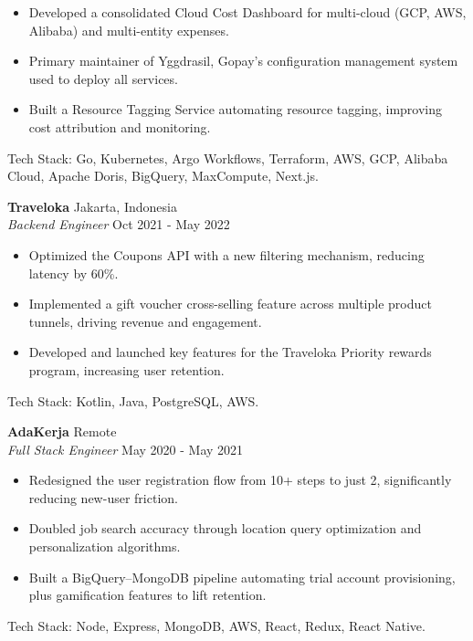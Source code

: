 \documentclass[a4paper]{article}
\begin{document}
\begin{itemize}
    \item Developed a consolidated Cloud Cost Dashboard for multi-cloud (GCP, AWS, Alibaba) and multi-entity expenses.
    \item Primary maintainer of Yggdrasil, Gopay's configuration management system used to deploy all services.
    \item Built a Resource Tagging Service automating resource tagging, improving cost attribution and monitoring.
\end{itemize}
Tech Stack: Go, Kubernetes, Argo Workflows, Terraform, AWS, GCP, Alibaba Cloud, Apache Doris, BigQuery, MaxCompute, Next.js.
\vspace{1.5mm}

\textbf{Traveloka} \hfill Jakarta, Indonesia\\
\textit{Backend Engineer} \hfill Oct 2021 - May 2022\\
\begin{itemize}
    \item Optimized the Coupons API with a new filtering mechanism, reducing latency by 60\%.
    \item Implemented a gift voucher cross-selling feature across multiple product tunnels, driving revenue and engagement.
    \item Developed and launched key features for the Traveloka Priority rewards program, increasing user retention.
\end{itemize}
Tech Stack: Kotlin, Java, PostgreSQL, AWS.
\vspace{1.5mm}

\textbf{AdaKerja} \hfill Remote\\
\textit{Full Stack Engineer} \hfill May 2020 - May 2021\\
\begin{itemize}
    \item Redesigned the user registration flow from 10+ steps to just 2, significantly reducing new-user friction.
    \item Doubled job search accuracy through location query optimization and personalization algorithms.
    \item Built a BigQuery--MongoDB pipeline automating trial account provisioning, plus gamification features to lift retention.
\end{itemize}
Tech Stack: Node, Express, MongoDB, AWS, React, Redux, React Native.
\vspace{1.5mm}
\end{document}
